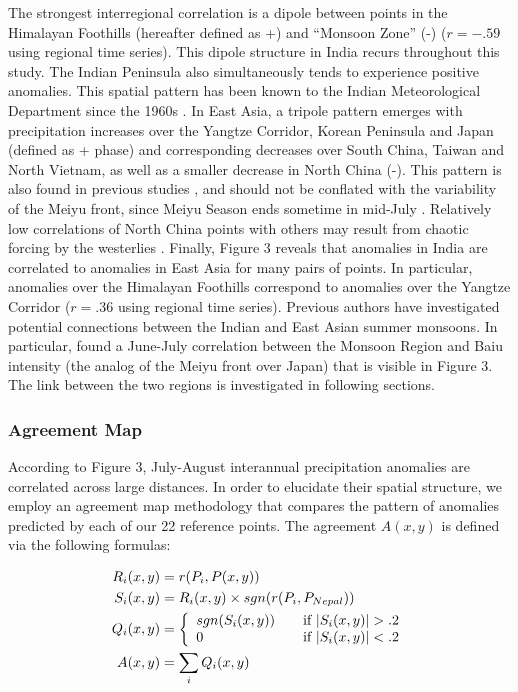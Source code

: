 \documentclass[12pt]{article}
\begin{document}
			
	 The strongest interregional correlation is a dipole between points in the Himalayan Foothills (hereafter defined as +) and ``Monsoon Zone'' (-) ($r=-.59$ using regional time series). This dipole structure in India recurs throughout this study. The Indian Peninsula also simultaneously tends to experience positive anomalies. This spatial pattern has been known to the Indian Meteorological Department since the 1960s \citep{Krishnamurthy2000}. In East Asia, a tripole pattern emerges with precipitation increases over the Yangtze Corridor, Korean Peninsula and Japan (defined as + phase) and corresponding decreases over South China, Taiwan and North Vietnam, as well as a smaller decrease in North China (-). This pattern is also found in previous studies \citep{Ding2008}, and should not be conflated with the variability of the Meiyu front, since Meiyu Season ends sometime in mid-July \cite{Wang2002}. Relatively low correlations of North China points with others may result from chaotic forcing by the westerlies \citep{Kosaka2012}. Finally, Figure 3 reveals that anomalies in India are correlated to anomalies in East Asia for many pairs of points. In particular, anomalies over the Himalayan Foothills correspond to anomalies over the Yangtze Corridor ($r=.36$ using regional time series). Previous authors have investigated potential connections between the Indian and East Asian summer monsoons\citep{Lau2000}\citep{Liu2008}. In particular, \cite{Krishnan2001} found a June-July correlation between the Monsoon Region and Baiu intensity (the analog of the Meiyu front over Japan) that is visible in Figure 3. The link between the two regions is investigated in following sections.
		
\subsubsection{Agreement Map}

	According to Figure 3, July-August interannual precipitation anomalies are correlated across large distances. In order to elucidate their spatial structure, we employ an agreement map methodology that compares the pattern of anomalies predicted by each of our 22 reference points. The agreement $A(x,y)$ is defined via the following formulas:
	
	\begin{align*}
	R_i(x,y)& = r(P_i,P(x,y)) \\
	S_i(x,y)& = R_i(x,y) \times sgn(r(P_i,P_{Nepal})) \\
	Q_i(x,y)& = \left\{
		\begin{array}{l l}
	 		sgn(S_i(x,y)) & \quad \text{if $|S_i(x,y)|>.2$} \\
	 		0 & \quad \text{if $|S_i(x,y)|<.2$}
	 	\end{array} \right. \\
	A(x,y)& = \sum_{i}Q_i(x,y)
	\end{align*}	
\end{document}
